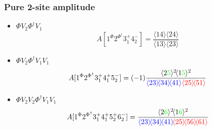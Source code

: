 \documentclass{beamer}
\newcommand{\avg}[1]{\langle #1 \rangle}
\newcommand{\mdavg}[2]{\langle #1 \rangle\!\langle #2 \rangle}
\begin{document}
\begin{frame}
    \frametitle{Pure 2-site amplitude}
    \begin{itemize}
        \item $\Phi V_2 \Phi^\dagger V_1$
        \begin{equation*}
            A[1^\Phi2^{\Phi^\dagger}3_1^+4_2^-]=\frac{\mdavg{14}{24}}{\mdavg{13}{23}}
        \end{equation*}
        \item $\Phi V_2 \Phi^\dagger V_1V_1$
        \begin{equation*}
            A[1^\Phi2^{\Phi^\dagger}3_1^+4_1^+5_2^-]=(-1)\frac{\avg{2\textcolor{green}{5}}^2\!\avg{1\textcolor{green}{5}}^2}{\textcolor{blue}{\mdavg{23}{34}\!\avg{41}}\textcolor{red}{\mdavg{25}{51}}}
        \end{equation*}
        \item $\Phi V_2V_2 \Phi^\dagger V_1V_1$
        \begin{equation*}
            A[1^\Phi2^{\Phi^\dagger}3_1^+4_1^+5_2^+6_2^-]=\frac{\avg{2\textcolor{green}{6}}^2\!\avg{1\textcolor{green}{6}}^2}{\textcolor{blue}{\mdavg{23}{34}\!\avg{41}}\!\textcolor{red}{\mdavg{25}{56}\!\avg{61}}}
        \end{equation*}       
    \end{itemize}
\end{frame}
\end{document}
